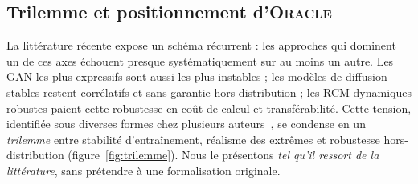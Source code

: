 \documentclass[14pt,a4paper,openany]{extreport}
\newcommand{\Oracle}{\textsc{Oracle}}
\begin{document}
\subsection{Trilemme et positionnement d'\Oracle{}}
\label{ssec:trilemme}

La littérature récente expose un schéma récurrent : les approches qui dominent un de ces axes échouent presque systématiquement sur au moins un autre. Les GAN les plus expressifs sont aussi les plus instables ; les modèles de diffusion stables restent corrélatifs et sans garantie hors-distribution ; les RCM dynamiques robustes paient cette robustesse en coût de calcul et transférabilité. Cette tension, identifiée sous diverses formes chez plusieurs auteurs~\cite{rampal_cgan_2024,mardani_corrdiff_2023,harris_2022}, se condense en un \emph{trilemme} entre stabilité d'entraînement, réalisme des extrêmes et robustesse hors-distribution (figure~\ref{fig:trilemme}). Nous le présentons \emph{tel qu'il ressort de la littérature}, sans prétendre à une formalisation originale.
\end{document}
